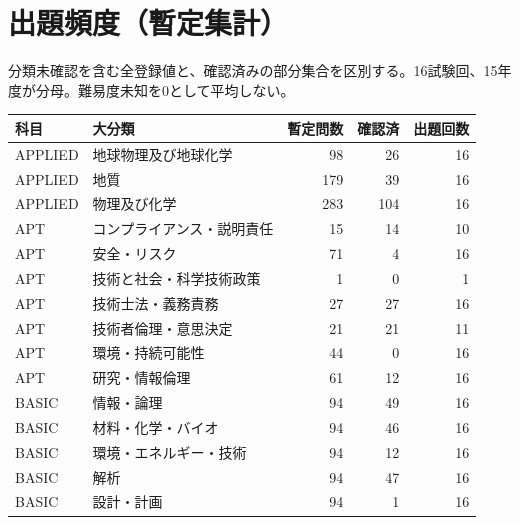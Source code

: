 \chapter{出題頻度（暫定集計）}
分類未確認を含む全登録値と、確認済みの部分集合を区別する。16試験回、15年度が分母。難易度未知を0として平均しない。
\begin{longtable}{p{.16\linewidth}p{.42\linewidth}rrr}
科目 & 大分類 & 暫定問数 & 確認済 & 出題回数\\\hline
APPLIED & 地球物理及び地球化学 & 98 & 26 & 16\\
APPLIED & 地質 & 179 & 39 & 16\\
APPLIED & 物理及び化学 & 283 & 104 & 16\\
APT & コンプライアンス・説明責任 & 15 & 14 & 10\\
APT & 安全・リスク & 71 & 4 & 16\\
APT & 技術と社会・科学技術政策 & 1 & 0 & 1\\
APT & 技術士法・義務責務 & 27 & 27 & 16\\
APT & 技術者倫理・意思決定 & 21 & 21 & 11\\
APT & 環境・持続可能性 & 44 & 0 & 16\\
APT & 研究・情報倫理 & 61 & 12 & 16\\
BASIC & 情報・論理 & 94 & 49 & 16\\
BASIC & 材料・化学・バイオ & 94 & 46 & 16\\
BASIC & 環境・エネルギー・技術 & 94 & 12 & 16\\
BASIC & 解析 & 94 & 47 & 16\\
BASIC & 設計・計画 & 94 & 1 & 16\\
\end{longtable}
